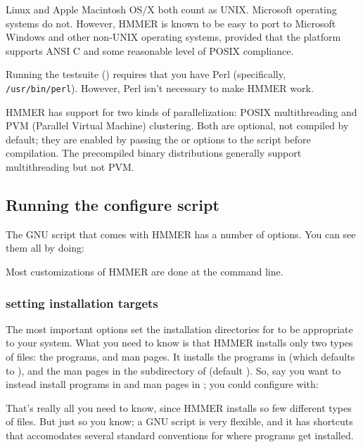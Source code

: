 Linux and Apple Macintosh OS/X both count as UNIX. Microsoft operating
systems do not. However, HMMER is known to be easy to port to
Microsoft Windows and other non-UNIX operating systems, provided that
the platform supports ANSI C and some reasonable level of POSIX
compliance.

Running the testsuite () requires that you have Perl
(specifically, \verb+/usr/bin/perl+). However, Perl isn't necessary to
make HMMER work.

HMMER has support for two kinds of parallelization: POSIX
multithreading and PVM (Parallel Virtual Machine) clustering.  Both
are optional, not compiled by default; they are enabled by passing the
 or  options to the
 script before compilation. The precompiled binary
distributions generally support multithreading but not PVM.

\subsection{Running the configure script}

The GNU  script that comes with HMMER has a number of
options. You can see them all by doing:


Most customizations of HMMER are done at the 
command line.

\subsubsection{setting installation targets}

The most important  options set the installation
directories for  to be appropriate to your system.
What you need to know is that HMMER installs only two types of files:
the programs, and man pages. It installs the programs in
 (which defaults to ), and the man
pages in the  subdirectory of  (default
). So, say you want  to
instead install programs in  and man pages in
; you could configure with:


That's really all you need to know, since HMMER installs so few
different types of files. But just so you know; a GNU 
script is very flexible, and it has shortcuts that accomodates several
standard conventions for where programs get installed. 


